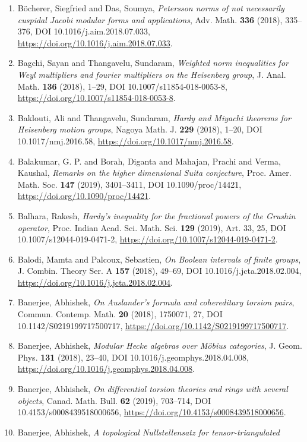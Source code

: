 \begin{enumerate}
\item B\"{o}cherer, Siegfried and Das, Soumya, {\em Petersson norms of not necessarily cuspidal {J}acobi modular
forms and applications}, Adv. Math. {\bf 336} (2018), 335--376, DOI 10.1016/j.aim.2018.07.033, \url{https://doi.org/10.1016/j.aim.2018.07.033}.
\item Bagchi, Sayan and Thangavelu, Sundaram, {\em Weighted norm inequalities for {W}eyl multipliers and fourier
multipliers on the {H}eisenberg group}, J. Anal. Math. {\bf 136} (2018), 1--29, DOI 10.1007/s11854-018-0053-8, \url{https://doi.org/10.1007/s11854-018-0053-8}.
\item Baklouti, Ali and Thangavelu, Sundaram, {\em Hardy and {M}iyachi theorems for {H}eisenberg motion groups}, Nagoya Math. J. {\bf 229} (2018), 1--20, DOI 10.1017/nmj.2016.58, \url{https://doi.org/10.1017/nmj.2016.58}.
\item Balakumar, G. P. and Borah, Diganta and Mahajan, Prachi and
Verma, Kaushal, {\em Remarks on the higher dimensional {S}uita conjecture}, Proc. Amer. Math. Soc. {\bf 147} (2019), 3401--3411, DOI 10.1090/proc/14421, \url{https://doi.org/10.1090/proc/14421}.
\item Balhara, Rakesh, {\em Hardy's inequality for the fractional powers of the {G}rushin
operator}, Proc. Indian Acad. Sci. Math. Sci. {\bf 129} (2019), Art. 33, 25, DOI 10.1007/s12044-019-0471-2, \url{https://doi.org/10.1007/s12044-019-0471-2}.
\item Balodi, Mamta and Palcoux, Sebastien, {\em On {B}oolean intervals of finite groups}, J. Combin. Theory Ser. A {\bf 157} (2018), 49--69, DOI 10.1016/j.jcta.2018.02.004, \url{https://doi.org/10.1016/j.jcta.2018.02.004}.
\item Banerjee, Abhishek, {\em On {A}uslander's formula and cohereditary torsion pairs}, Commun. Contemp. Math. {\bf 20} (2018), 1750071, 27, DOI 10.1142/S0219199717500717, \url{https://doi.org/10.1142/S0219199717500717}.
\item Banerjee, Abhishek, {\em Modular {H}ecke algebras over {M}\"{o}bius categories}, J. Geom. Phys. {\bf 131} (2018), 23--40, DOI 10.1016/j.geomphys.2018.04.008, \url{https://doi.org/10.1016/j.geomphys.2018.04.008}.
\item Banerjee, Abhishek, {\em On differential torsion theories and rings with several
objects}, Canad. Math. Bull. {\bf 62} (2019), 703--714, DOI 10.4153/s0008439518000656, \url{https://doi.org/10.4153/s0008439518000656}.
\item Banerjee, Abhishek, {\em A topological {N}ullstellensatz for tensor-triangulated
}
\end{enumerate}
